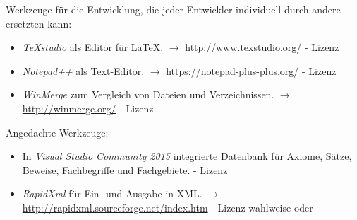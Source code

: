 \documentclass[english,ngerman,parskip=half,headsepline,footsepline]{scrreprt}
\newcounter{Enumi}
\begin{document}
	Werkzeuge für die Entwicklung, die jeder Entwickler individuell durch andere ersetzten kann:
	\begin{itemize}
		\setcounter{enumi}{\value{Enumi}}
		
		\item\label{Werkzeug:TeXstudio}\emph{\TeX studio} als Editor für \LaTeX. $\rightarrow$ \url{http://www.texstudio.org/} - Lizenz \cite{GPLii}
		
		\item\label{Werkzeug:Notepadpp}\emph{Notepad++} als Text-Editor. $\rightarrow$ \url{https://notepad-plus-plus.org/} - Lizenz \cite{GPLi}
		
		\item\label{Werkzeug:WinMerge}\emph{WinMerge} zum Vergleich von Dateien und Verzeichnissen. $\rightarrow$ \url{http://winmerge.org/} - Lizenz \cite{GPLi}
		
		\setcounter{Enumi}{\value{enumi}}
	\end{itemize}
	
	Angedachte Werkzeuge:
	\begin{itemize}
		\setcounter{enumi}{\value{Enumi}}
		
		\item\label{Werkzeug:VSCDB}In \emph{Visual Studio Community 2015} integrierte Datenbank für Axiome, Sätze, Beweise, Fachbegriffe und Fachgebiete. - Lizenz \cite{EULA}
		
		\item\label{Werkzeug:RapidXml}\emph{RapidXml} für Ein- und Ausgabe in XML. $\rightarrow$ \url{http://rapidxml.sourceforge.net/index.htm} - Lizenz wahlweise \cite{BSLi} oder \cite{MIT}
		
	\end{itemize}
	
\end{document}
